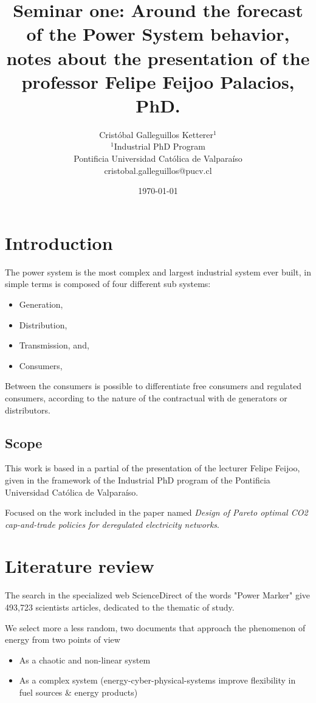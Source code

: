 \documentclass{article}
\title{Seminar one: Around the forecast of the Power System behavior, notes about the presentation of the professor Felipe Feijoo Palacios, PhD.}
\author{Cristóbal Galleguillos Ketterer$^{1}$\\
\small{$^{1}$Industrial PhD Program}\\
\small{Pontificia Universidad Católica de Valparaíso}\\
\small{cristobal.galleguillos@pucv.cl}
}
\date{\small{\today}}
\begin{document}
\maketitle

\section{Introduction}

The power system is the most complex and largest industrial system ever built, in simple terms is composed of four different sub systems:

\begin{itemize}
    \item Generation,
    \item Distribution,
    \item Transmission, and,
    \item Consumers,
\end{itemize}

Between the consumers is possible to differentiate free consumers and regulated consumers, according to the nature of the contractual with de generators or distributors.

\subsection{Scope}

This work is based in a partial of the presentation of the lecturer Felipe Feijoo, given in the framework of the Industrial PhD program of the Pontificia Universidad Católica de Valparaíso.

Focused on the work included in the paper named \textit{Design of Pareto optimal CO2 cap-and-trade policies for deregulated electricity networks}.

\section{Literature review}

The search in the specialized web ScienceDirect of the words "Power Marker" give 493,723 scientists articles, dedicated to the thematic of study.

We select more a less random, two documents that approach the phenomenon of energy from two points of view

\begin{itemize}
    \item As a chaotic and non-linear system
    \item As a complex system (energy-cyber-physical-systems  improve flexibility in fuel sources & energy products)
\end{itemize}
\end{document}
